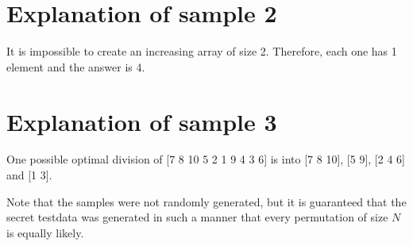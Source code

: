 \section*{Explanation of sample 2}
It is impossible to create an increasing array of size 2. Therefore, each one has 1 element and the answer is
4.

\section*{Explanation of sample 3}
One possible optimal division of [7 8 10 5 2 1 9 4 3 6] is into [7 8 10], [5 9], [2 4 6] and [1 3].

Note that the samples were not randomly generated, but it is guaranteed that the secret testdata was generated
in such a manner that every permutation of size $N$ is equally likely.
